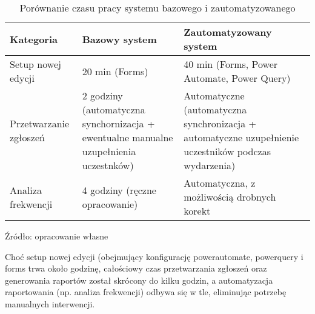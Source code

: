 \begin{table}[ht]
    \centering
    \renewcommand{\arraystretch}{1.3} %
    \caption[Porównanie czasu pracy systemu bazowego i zautomatyzowanego, źródło: opracowanie własne]{Porównanie czasu pracy systemu bazowego i zautomatyzowanego}
    \begin{tabular}{| p{4cm} | p{5cm} | p{5cm} |}
        \hline
        \textbf{Kategoria} & \textbf{Bazowy system} & \textbf{Zautomatyzowany system} \\
        \hline
        Setup nowej edycji & 20 min (Forms) & 40 min (Forms, Power Automate, Power Query) \\
        \hline
        Przetwarzanie zgłoszeń & 2 godziny (automatyczna synchornizacja + ewentualne manualne uzupełnienia uczestnków) & Automatyczne (automatyczna synchronizacja + automatyczne uzupełnienie uczestników podczas wydarzenia) \\
        \hline
        Analiza frekwencji & 4 godziny (ręczne opracowanie) & Automatyczna, z możliwością drobnych korekt \\
        \hline
    \end{tabular}
    \vspace{0.5em}
    \par\raggedright\footnotesize{Źródło: opracowanie własne}
\end{table}

Choć setup nowej edycji (obejmujący konfigurację \gls{powerautomate}, \gls{powerquery} i \gls{forms} trwa około godzinę, całościowy czas przetwarzania zgłoszeń oraz generowania raportów został skrócony do kilku godzin, a automatyzacja raportowania (np. analiza frekwencji) odbywa się w tle, eliminując potrzebę manualnych interwencji.

